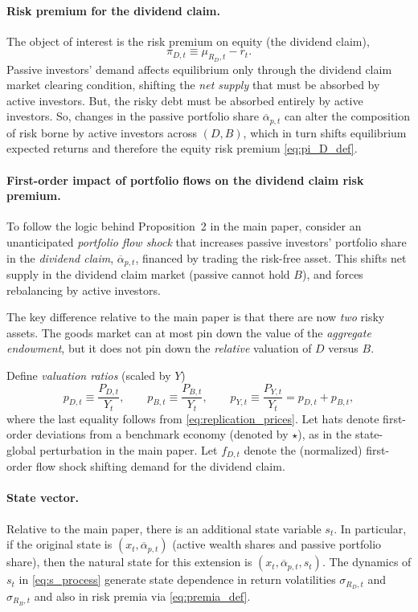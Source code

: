 \documentclass[11pt,english]{article}
\begin{document}
\paragraph{Risk premium for the dividend claim.}
The object of interest is the risk premium on equity (the dividend claim),
\begin{equation}\label{eq:pi_D_def}
    \pi_{D,t}\equiv \mu_{R_D,t}-r_t.
\end{equation}
Passive investors' demand affects equilibrium only through the dividend claim market clearing condition, shifting the \emph{net supply} that must be absorbed by active investors. But, the risky debt must be absorbed entirely by active investors. So, changes in the passive portfolio share $\overline{\alpha}_{p,t}$ can alter the composition of risk borne by active investors across $(D,B)$, which in turn shifts equilibrium expected returns and therefore the equity risk premium \eqref{eq:pi_D_def}.

\paragraph{First-order impact of portfolio flows on the dividend claim risk premium.}%
To follow the logic behind Proposition~2 in the main paper, consider an unanticipated \emph{portfolio flow shock} that increases passive investors' portfolio share in the \textit{dividend claim}, $\overline{\alpha}_{p,t}$, financed by trading the risk-free asset. This shifts net supply in the dividend claim market (passive cannot hold $B$), and forces rebalancing by active investors.

The key difference relative to the main paper is that there are now \emph{two} risky assets. The goods market can at most pin down the value of the \emph{aggregate endowment}, but it does not pin down the \emph{relative} valuation of $D$ versus $B$.

Define \emph{valuation ratios} (scaled by $Y$)
\[
    p_{D,t}\equiv \frac{P_{D,t}}{Y_t},\qquad
    p_{B,t}\equiv \frac{P_{B,t}}{Y_t},\qquad
    p_{Y,t}\equiv \frac{P_{Y,t}}{Y_t}=p_{D,t}+p_{B,t},
\]
where the last equality follows from \eqref{eq:replication_prices}. Let hats denote first-order deviations from a benchmark economy (denoted by $\star$), as in the state-global perturbation in the main paper. Let $f_{D,t}$ denote the (normalized) first-order flow shock shifting demand for the dividend claim.


\paragraph{State vector.}
Relative to the main paper, there is an additional state variable $s_t$. In particular, if the original state is $(x_t,\overline{\alpha}_{p,t})$ (active wealth shares and passive portfolio share), then the natural state for this extension is $(x_t,\overline{\alpha}_{p,t},s_t)$. The dynamics of $s_t$ in \eqref{eq:s_process} generate state dependence in return volatilities $\sigma_{R_D,t}$ and $\sigma_{R_B,t}$ and also in risk premia via \eqref{eq:premia_def}.
\end{document}
